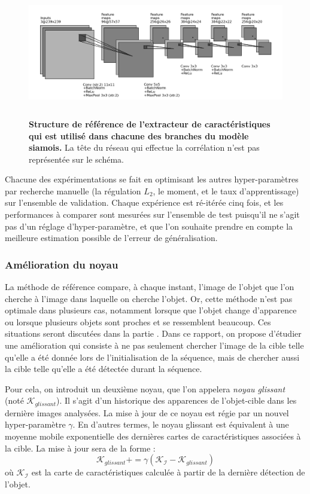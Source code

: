 \documentclass[10pt,twocolumn,letterpaper,french]{article}
\begin{document}
\begin{figure}[!h]
  \centering
  \includegraphics[height=160pt]{images/archis/convnet_cnn5.png}
  \caption{\textbf{Structure de référence de l'extracteur de caractéristiques qui est utilisé dans chacune des branches du modèle siamois.} La tête du réseau qui effectue la corrélation n'est pas représentée sur le schéma.}
  \label{archi_ref}
  \end{figure}


Chacune des expérimentations se fait en optimisant les autres hyper-paramètres par recherche manuelle (la régulation $L_2$, le moment, et le taux d'apprentissage) sur l'ensemble de validation. Chaque expérience est ré-itérée cinq fois, et les performances à comparer sont mesurées sur l'ensemble de test puisqu'il ne s'agit pas d'un réglage d'hyper-paramètre, et que l'on souhaite prendre en compte la meilleure estimation possible de l'erreur de généralisation.


\subsubsection*{Amélioration du noyau}
\label{noyau}

La méthode de référence compare, à chaque instant, l'image de l'objet que l'on cherche à l'image dans laquelle on cherche l'objet. Or, cette méthode n'est pas optimale dans plusieurs cas, notamment lorsque que l'objet change d'apparence ou lorsque plusieurs objets sont proches et se ressemblent beaucoup. Ces situations seront discutées dans la partie \textit{}. Dans ce rapport, on propose d'étudier une amélioration qui consiste à ne pas seulement chercher l'image de la cible telle qu'elle a été donnée lors de l'initialisation de la séquence, mais de chercher aussi la cible telle qu'elle a été détectée durant la séquence.

Pour cela, on introduit un deuxième noyau, que l'on appelera \textit{noyau glissant} (noté $\mathcal{K}_{glissant}$). Il s'agit d'un historique des apparences de l'objet-cible dans les dernière images analysées. La mise à jour de ce noyau est régie par un nouvel hyper-paramètre $\gamma$. En d'autres termes, le noyau glissant est équivalent à une moyenne mobile exponentielle des dernières cartes de caractéristiques associées à la cible. La mise à jour sera de la forme : 
$$\mathcal{K}_{glissant} += \gamma(\mathcal{K}_{\mathcal{I}}-\mathcal{K}_{glissant})$$
où $\mathcal{K}_{\mathcal{I}}$ est la carte de caractéristiques calculée à partir de la dernière détection de l'objet.\\
\end{document}
